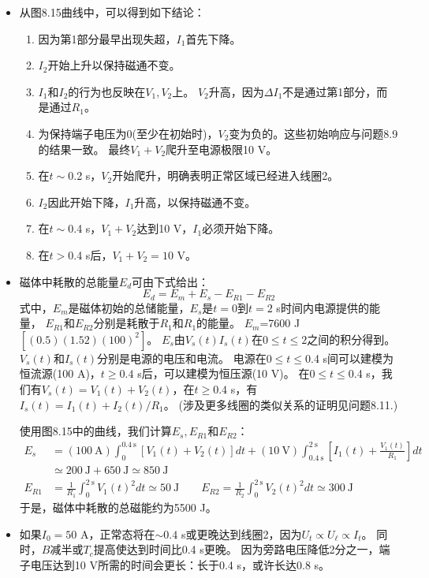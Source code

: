 \begin{itemize}
\item 从图8.15曲线中，可以得到如下结论：
	\begin{enumerate}
		\item  因为第1部分最早出现失超，$I_1$首先下降。
		\item $I_2$开始上升以保持磁通不变。
		\item $I_1$和$I_2$的行为也反映在$V_1,V_2$上。
		$V_2$升高，因为$\Delta I_1$不是通过第1部分，而是通过$R_1$。
		\item 为保持端子电压为0(至少在初始时)，$V_2$变为负的。这些初始响应与问题8.9的结果一致。
		最终$V_1+V_2$爬升至电源极限10 V。
		\item 在$t\sim$0.2 s，$V_2$开始爬升，明确表明正常区域已经进入线圈2。
		\item $I_2$因此开始下降，$I_1$升高，以保持磁通不变。
		\item 在$t\sim$0.4 s，$V_1+V_2$达到10 V，$I_1$必须开始下降。
		\item 在$t>$0.4 s后，$V_1+V_2=10$ V。
	\end{enumerate}
\item 磁体中耗散的总能量$E_d$可由下式给出：
\begin{equation}%
E_d=E_m+E_s-E_{R1}-E_{R2}
\end{equation}
式中，$E_m$是磁体初始的总储能量，$E_s$是$t=0$到$t=2$ s时间内电源提供的能量，
$E_{R1}$和$E_{R2}$分别是耗散于$R_1$和$R_1$的能量。
$E_m$=7600 J$[(0.5)(1.52)(100)^2]$。
$E_s$由$V_s(t)I_s(t)$在$0\le t\le 2$之间的积分得到。
$V_s(t)$和$I_s(t)$分别是电源的电压和电流。
电源在$0\le t\le$0.4 s间可以建模为恒流源(100 A)，$t\ge 0.4$ s后，可以建模为恒压源(10 V)。
在$0\le t\le$0.4 s，我们有$V_s(t)=V_1(t)+V_2(t)$，在$t\ge 0.4$ s，有$I_s(t)=I_1(t)+I_2(t)/R_1$。
(涉及更多线圈的类似关系的证明见问题8.11.)

使用图8.15中的曲线，我们计算$E_s,E_{R1}$和$E_{R2}$：
\begin{align*}
E_s&=(100\ \mathrm{A})\int_{0}^{0.4\ \mathrm{s}}[V_1(t)+V_2(t)]dt+(10\ \mathrm{V})\int_{0.4\ \mathrm{s}}^{2\ \mathrm{s}}\left[I_1(t)+\frac{V_1(t)}{R_1}\right]dt \\
&\simeq 200\ \mathrm{J}+650\ \mathrm{J}\simeq 850\ \mathrm{J}\\
E_{R1}&=\frac{1}{R_1}\int_{0}^{2\ \mathrm{s}}V_1(t)^2dt\simeq 50\ \mathrm{J} \qquad
E_{R2}=\frac{1}{R_2}\int_{0}^{2\ \mathrm{s}}V_2(t)^2dt\simeq 300\ \mathrm{J}
\end{align*}
于是，磁体中耗散的总磁能约为5500 J。

\item 如果$I_0=50$ A，正常态将在$\sim 0.4$ s或更晚达到线圈2，因为$U_t\propto U_\ell\propto I_t$。
同时，$B$减半或$T_c$提高使达到时间比0.4 s更晚。
因为旁路电压降低2分之一，端子电压达到10 V所需的时间会更长：长于0.4 s，或许长达0.8 s。


\end{itemize}
